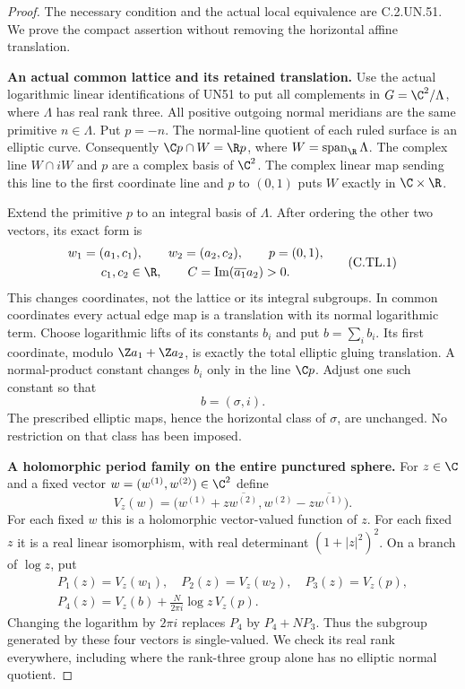 \begin{proof}
The necessary condition and the actual local equivalence are
C.2.UN.51. We prove the compact assertion without removing the
horizontal affine translation.

\par\medskip\noindent\textbf{An actual common lattice and its retained translation.}
Use the actual logarithmic linear identifications of UN51 to put
all complements in $G=\C^2/\Lambda$, where $\Lambda$ has real
rank three. All positive outgoing normal meridians are the same
primitive $n\in\Lambda$. Put $p=-n$. The normal-line quotient of
each ruled surface is an elliptic curve. Consequently
$\C p\cap W=\R p$, where $W=\operatorname{span}_{\R}\Lambda$.
The complex line $W\cap iW$ and $p$ are a complex basis of
$\C^2$. The complex linear map sending this line to the first
coordinate line and $p$ to $(0,1)$ puts $W$ exactly in
$\C\times\R$.

Extend the primitive $p$ to an integral basis of $\Lambda$.
After ordering the other two vectors, its exact form is
\[
 \begin{gathered}
 w_1=(a_1,c_1),\qquad w_2=(a_2,c_2),\qquad p=(0,1),\\
 c_1,c_2\in\R,\qquad
 C=\operatorname{Im}(\overline{a_1}a_2)>0.
 \end{gathered}
 \tag{C.TL.1}
\]
This changes coordinates, not the lattice or its integral
subgroups. In common coordinates every actual edge map is a
translation with its normal logarithmic term. Choose logarithmic
lifts of its constants $b_i$ and put $b=\sum_i b_i$.
Its first coordinate, modulo
$\Z a_1+\Z a_2$, is exactly the total elliptic gluing translation.
A normal-product constant changes $b_i$ only in the line
$\C p$. Adjust one such constant so that
\[
                         b=(\sigma,i).
 \tag{C.TL.2}
\]
The prescribed elliptic maps, hence the horizontal class of
$\sigma$, are unchanged. No restriction on that class has been
imposed.

\par\medskip\noindent\textbf{A holomorphic period family on the entire punctured sphere.}
For $z\in\C$ and a fixed vector $w=(w^{(1)},w^{(2)})\in\C^2$
define
\[
 V_z(w)=
 \bigl(w^{(1)}+z\overline{w^{(2)}},
       w^{(2)}-z\overline{w^{(1)}}\bigr).
 \tag{C.TL.3}
\]
For each fixed $w$ this is a holomorphic vector-valued function
of $z$. For each fixed $z$ it is a real linear isomorphism,
with real determinant $(1+|z|^2)^2$. On a branch of $\log z$,
put
\[
 \begin{gathered}
 P_1(z)=V_z(w_1),\quad P_2(z)=V_z(w_2),\quad
 P_3(z)=V_z(p),\\
 P_4(z)=V_z(b)+\frac{N}{2\pi i}\log z\,V_z(p).
 \end{gathered}
 \tag{C.TL.4}
\]
Changing the logarithm by $2\pi i$ replaces $P_4$ by
$P_4+NP_3$. Thus the subgroup generated by these four vectors
is single-valued. We check its real rank everywhere, including
where the rank-three group alone has no elliptic normal quotient.


\end{proof}
